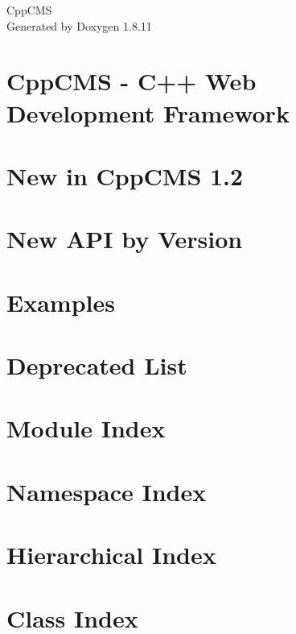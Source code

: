 \documentclass[twoside]{book}
\newcommand{\+}{\discretionary{\mbox{\scriptsize$\hookleftarrow$}}{}{}}
\newcommand{\clearemptydoublepage}{%
  \newpage{\pagestyle{empty}\cleardoublepage}%
}
\begin{document}
\begin{titlepage}
\vspace*{7cm}
\begin{center}%
{\Large Cpp\+C\+MS }\\
\vspace*{1cm}
{\large Generated by Doxygen 1.8.11}\\
\end{center}
\end{titlepage}
\clearemptydoublepage
\tableofcontents
\clearemptydoublepage
{}

\chapter{Cpp\+C\+MS -\/ C++ Web Development Framework}
\label{index}
\chapter{New in Cpp\+C\+MS 1.2}
\label{v1_2}

\chapter{New A\+PI by Version}
\label{new_api}

\chapter{Examples}
\label{examples_page}

\chapter{Deprecated List}
\label{deprecated}

\chapter{Module Index}

\chapter{Namespace Index}

\chapter{Hierarchical Index}

\chapter{Class Index}

\end{document}
